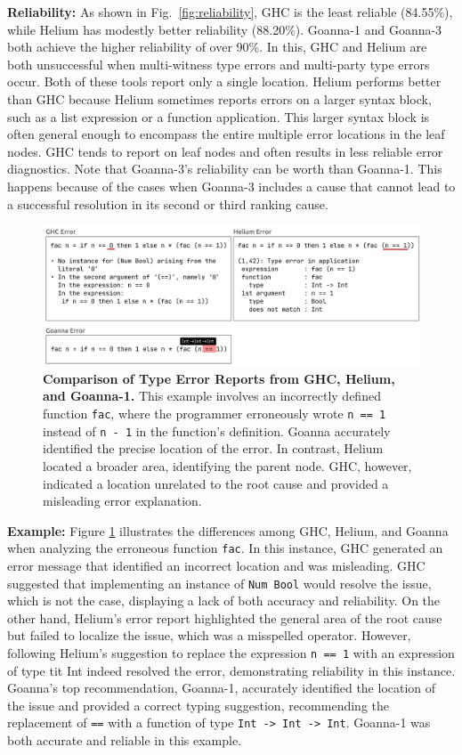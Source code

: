 \documentclass[pdflatex,lineno,sn-nature,Numbered]{sn-jnl}%
\begin{document}
\textbf{Reliability:} As shown in Fig.~\ref{fig:reliability}, GHC is the least reliable (84.55\%), while Helium has modestly better reliability (88.20\%). Goanna-1 and Goanna-3 both achieve the higher reliability of over 90\%. In this, GHC and Helium are both unsuccessful when multi-witness type errors and multi-party type errors occur. Both of these tools report only a single location. Helium performs better than GHC because Helium sometimes reports errors on a larger syntax block, such as a list expression or a function application. This larger syntax block is often general enough to encompass the entire multiple error locations in the leaf nodes. GHC tends to report on leaf nodes and often results in less reliable error diagnostics. Note that Goanna-3's reliability can be worth than Goanna-1. This happens because of the cases when Goanna-3 includes a cause that cannot lead to a successful resolution in its second or third ranking cause. 
    \begin{figure}
        \centering
        \includegraphics[width=\linewidth]{images/ErrorCompare}
\caption{{\bf Comparison of Type Error Reports from GHC, Helium, and Goanna-1.} This example involves an incorrectly defined function {\tt fac}, where the programmer erroneously wrote {\tt n == 1} instead of {\tt n - 1} in the function's definition. Goanna accurately identified the precise location of the error. In contrast, Helium located a broader area, identifying the parent node. GHC, however, indicated a location unrelated to the root cause and provided a misleading error explanation.}
        \label{fig:error-compare}
    \end{figure}


\textbf{Example:} Figure \ref{fig:error-compare} illustrates the differences among GHC, Helium, and Goanna when analyzing the erroneous function {\tt fac}. In this instance, GHC generated an error message that identified an incorrect location and was misleading. GHC suggested that implementing an instance of {\tt Num Bool} would resolve the issue, which is not the case, displaying a lack of both accuracy and reliability. On the other hand, Helium's error report highlighted the general area of the root cause but failed to localize the issue, which was a misspelled operator. However, following Helium's suggestion to replace the expression {\tt n == 1} with an expression of type {tit Int} indeed resolved the error, demonstrating reliability in this instance. Goanna's top recommendation, Goanna-1, accurately identified the location of the issue and provided a correct typing suggestion, recommending the replacement of {\tt ==} with a function of type {\tt Int -> Int -> Int}. Goanna-1 was both accurate and reliable in this example.
    
\end{document}
